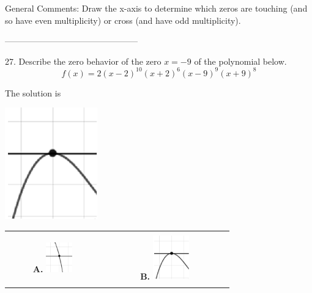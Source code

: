 \documentclass{article}[14pt]
\begin{document}
General Comments: Draw the x-axis to determine which zeros are touching (and so have even multiplicity) or cross (and have odd multiplicity).

-----------------------------------------------

27. Describe the zero behavior of the zero $x = -9$ of the polynomial below.
$$ f(x) = 2(x - 2)^{10}(x + 2)^{6}(x - 9)^{9}(x + 9)^{8} $$ 

 
 The solution is  
 \begin{center} \includegraphics[width=0.3\textwidth]{../Figures/zeroBehaviorNegativeEvenC.png} \end{center}\begin{tabular}{|c|c|} 
\hline 
 & \tabularnewline 
 \textbf{A.} \includegraphics[width=0.3\textwidth]{../Figures/zeroBehaviorNegativeOddC.png} & \textbf{B.} \includegraphics[width=0.3\textwidth]{../Figures/zeroBehaviorNegativeEvenC.png} \tabularnewline 
\hline 
 & \tabularnewline 

\end{tabular}
\end{document}
